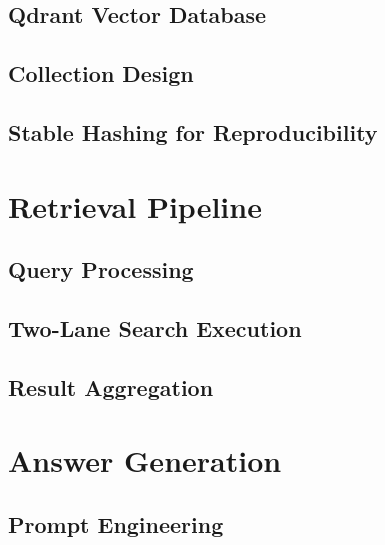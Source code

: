 \subsection{Qdrant Vector Database}
\label{subsec:methodology:indexing:qdrant}

\subsection{Collection Design}
\label{subsec:methodology:indexing:collections}

\subsection{Stable Hashing for Reproducibility}
\label{subsec:methodology:indexing:hashing}

%
%
\section{Retrieval Pipeline}
\label{sec:methodology:retrieval}

\subsection{Query Processing}
\label{subsec:methodology:retrieval:query}

\subsection{Two-Lane Search Execution}
\label{subsec:methodology:retrieval:execution}

\subsection{Result Aggregation}
\label{subsec:methodology:retrieval:aggregation}

%
%
\section{Answer Generation}
\label{sec:methodology:generation}

\subsection{Prompt Engineering}
\label{subsec:methodology:generation:prompts}


